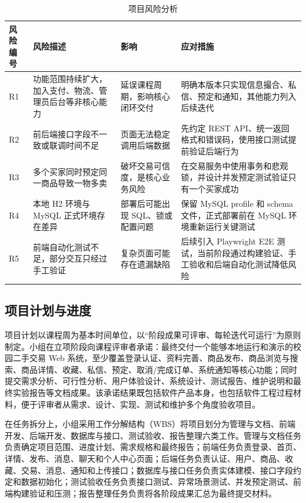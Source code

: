 ﻿\documentclass[UTF8,a4paper,12pt]{ctexart}
\begin{document}
\begin{table}[H]
  \centering
  \caption{项目风险分析}
  \label{tab:feasibility-risk}
  \begin{tabular}{p{2cm}p{4.2cm}p{3.2cm}p{4.5cm}}
    \toprule
    风险编号 & 风险描述 & 影响 & 应对措施 \\
    \midrule
    R1 & 功能范围持续扩大，加入支付、物流、管理员后台等非核心能力 & 延误课程周期，影响核心闭环交付 & 明确本版本只实现信息撮合、私信、预定和通知，其他能力列入后续迭代 \\
    R2 & 前后端接口字段不一致或联调时间不足 & 页面无法稳定调用后端数据 & 先约定 REST API、统一返回格式和错误码，使用接口测试提前验证后端行为 \\
    R3 & 多个买家同时预定同一商品导致一物多卖 & 破坏交易可信度，是核心业务风险 & 在交易服务中使用事务和悲观锁，并设计并发预定测试验证只有一个买家成功 \\
    R4 & 本地 H2 环境与 MySQL 正式环境存在差异 & 部署后可能出现 SQL、锁或配置问题 & 保留 MySQL profile 和 schema 文件，正式部署前在 MySQL 环境重新运行关键测试 \\
    R5 & 前端自动化测试不足，部分交互只经过手工验证 & 复杂页面可能存在遗漏缺陷 & 后续引入 Playwright E2E 测试，当前阶段通过构建验证、手工验收和后端自动化测试降低风险 \\
    \bottomrule
  \end{tabular}
\end{table}

\subsection{项目计划与进度}
项目计划以课程周为基本时间单位，以“阶段成果可评审、每轮迭代可运行”为原则制定。小组在立项阶段向课程评审者承诺：最终交付一个能够本地运行和演示的校园二手交易 Web 系统，至少覆盖登录认证、资料完善、商品发布、商品浏览与搜索、商品详情、收藏、私信、预定、取消/完成订单、系统通知等核心功能；同时提交需求分析、可行性分析、用户体验设计、系统设计、测试报告、维护说明和最终实验报告等文档成果。该承诺结果既包括软件产品本身，也包括软件工程过程材料，便于评审者从需求、设计、实现、测试和维护多个角度验收项目。

在任务拆分上，小组采用工作分解结构（WBS）将项目划分为管理与文档、前端开发、后端开发、数据库与接口、测试验收、报告整理六类工作。管理与文档任务负责确定项目范围、进度计划、需求规格和最终报告；前端任务负责登录、首页、详情、发布、消息、聊天和个人中心页面；后端任务负责认证、用户、商品、收藏、交易、消息、通知和上传接口；数据库与接口任务负责实体建模、接口字段约定和数据初始化；测试验收任务负责接口测试、异常场景测试、并发预定测试、前端构建验证和压测；报告整理任务负责将各阶段成果汇总为最终提交材料。
\end{document}

